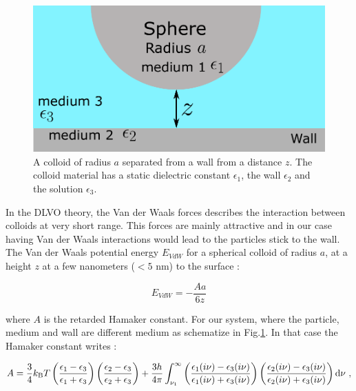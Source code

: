\begin{figure}[h]
	\centering
	\includegraphics{02_body/chapter3/images/vdw_scheme.pdf}
	\caption{A colloid of radius $a$ separated from a wall from a distance $z$. The colloid material has a static dielectric constant $\epsilon_1$, the wall $\epsilon_2$ and the solution $\epsilon_3$. }
	\label{Fig:vdw}
\end{figure}

In the DLVO theory, the Van der Waals forces describes the interaction between colloids at very short range. This forces are mainly attractive and in our case having Van der Waals interactions would lead to the particles stick to the wall. The Van der Waals potential energy $E_{VdW}$ for a spherical colloid of radius $a$, at a height $z$  at a few nanometers ($< 5$ nm) to the surface \cite{israelachvili_intermolecular_2015}:

\begin{equation}
	E_{VdW} = -\frac{A a}{6z} 
\end{equation}

where $A$ is the retarded Hamaker constant. For our system, where the particle, medium and wall are different medium as schematize in Fig.\ref{Fig:vdw}. In that case the Hamaker constant writes \cite{israelachvili_intermolecular_2015}:

\begin{equation}
	A = \frac{3}{4} k_\mathrm{B}T \left(
	\frac{\epsilon_1 - \epsilon_3}{\epsilon_1 + \epsilon_3}
	\right)
	\left(
	\frac{\epsilon_2 - \epsilon_3}{\epsilon_2 + \epsilon_3}
	\right)
	+
	\frac{3h}{4\pi}
	\int_{\nu_1}^{\infty}
	\left(
	\frac{\epsilon_1 (i\nu) - \epsilon_3 (i\nu)}{\epsilon_1 (i\nu) + \epsilon_3 (i\nu)}
	\right)
	\left(
	\frac{\epsilon_2 (i\nu) - \epsilon_3 (i\nu)}{\epsilon_2 (i\nu) + \epsilon_3 (i\nu)}
	\right)
	\textnormal{d}\nu ~,
\end{equation}

